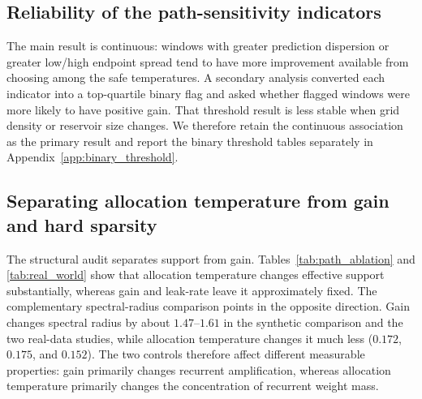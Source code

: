 \documentclass[preprint,12pt,authoryear]{elsarticle}
\begin{document}
\begin{table}[t]
\centering
\caption{Safe-region width at $\epsilon_{\mathrm{rel}}=0.10$ using each study's native absolute tolerance. The controlled synthetic panel and Air Quality show containment enrichment over same-width controls, while Appliances Energy provides a null/counterexample. Mean best-safe gain uses the same definition in all rows.}
\label{tab:m21_safe_width}
\end{table}

\subsection{Reliability of the path-sensitivity indicators}

The main result is continuous: windows with greater prediction dispersion or greater low/high endpoint spread tend to have more improvement available from choosing among the safe temperatures. A secondary analysis converted each indicator into a top-quartile binary flag and asked whether flagged windows were more likely to have positive gain. That threshold result is less stable when grid density or reservoir size changes. We therefore retain the continuous association as the primary result and report the binary threshold tables separately in Appendix~\ref{app:binary_threshold}.

\subsection{Separating allocation temperature from gain and hard sparsity}

The structural audit separates support from gain. Tables~\ref{tab:path_ablation} and \ref{tab:real_world} show that allocation temperature changes effective support substantially, whereas gain and leak-rate leave it approximately fixed. The complementary spectral-radius comparison points in the opposite direction. Gain changes spectral radius by about $1.47$--$1.61$ in the synthetic comparison and the two real-data studies, while allocation temperature changes it much less ($0.172$, $0.175$, and $0.152$). The two controls therefore affect different measurable properties: gain primarily changes recurrent amplification, whereas allocation temperature primarily changes the concentration of recurrent weight mass.
\end{document}
